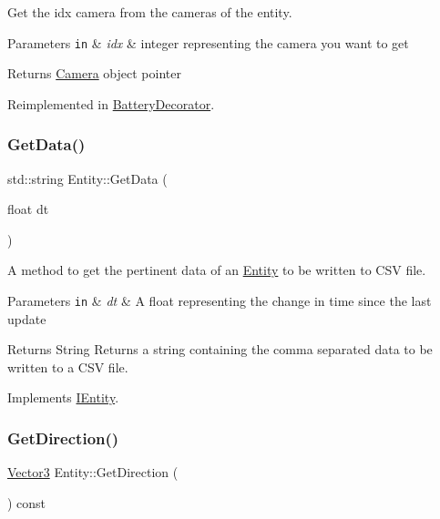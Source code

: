 Get the idx camera from the cameras of the entity. 


\begin{DoxyParams}[1]{Parameters}
\mbox{\tt in}  & {\em idx} & integer representing the camera you want to get\\
\hline
\end{DoxyParams}
\begin{DoxyReturn}{Returns}
\hyperlink{classCamera}{Camera} object pointer 
\end{DoxyReturn}


Reimplemented in \hyperlink{classBatteryDecorator_ad65baa2cd098b990a49bdff7c0fde62c}{Battery\+Decorator}.

\mbox{\label{classEntity_a25fcdac45c906ba995f427ce6facab96}} 
\subsubsection{\texorpdfstring{Get\+Data()}{GetData()}}
{\footnotesize\ttfamily std\+::string Entity\+::\+Get\+Data (\begin{DoxyParamCaption}\item[{float}]{dt }\end{DoxyParamCaption})\hspace{0.3cm}{\ttfamily [virtual]}}



A method to get the pertinent data of an \hyperlink{classEntity}{Entity} to be written to C\+SV file. 


\begin{DoxyParams}[1]{Parameters}
\mbox{\tt in}  & {\em dt} & A float representing the change in time since the last update\\
\hline
\end{DoxyParams}
\begin{DoxyReturn}{Returns}
String Returns a string containing the comma separated data to be written to a C\+SV file. 
\end{DoxyReturn}


Implements \hyperlink{classIEntity_a4d9355e68c6be349f57dc67fc1c036ba}{I\+Entity}.

\mbox{\label{classEntity_aae3890ab5d3d17ef4f805e735890f077}} 
\subsubsection{\texorpdfstring{Get\+Direction()}{GetDirection()}}
{\footnotesize\ttfamily \hyperlink{classVector3}{Vector3} Entity\+::\+Get\+Direction (\begin{DoxyParamCaption}{ }\end{DoxyParamCaption}) const\hspace{0.3cm}{\ttfamily [virtual]}}



